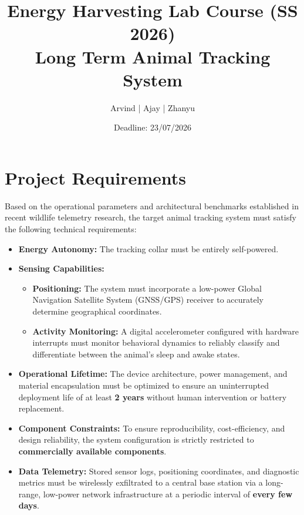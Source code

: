 \documentclass[paper=a4]{article}
\begin{document}
\title{Energy Harvesting Lab Course (SS 2026) \\ \Large    Long Term Animal Tracking System}
\author{Arvind | Ajay | Zhanyu} 
\date{Deadline: 23/07/2026} %
\maketitle

\section{Project Requirements}
Based on the operational parameters and architectural benchmarks established in recent wildlife telemetry research, the target animal tracking system must satisfy the following technical requirements:

\begin{itemize}
    \item \textbf{Energy Autonomy:} The tracking collar must be entirely self-powered.
    \item \textbf{Sensing Capabilities:}
    \begin{itemize}
        \item \textbf{Positioning:} The system must incorporate a low-power Global Navigation Satellite System (GNSS/GPS) receiver to accurately determine geographical coordinates.
        \item \textbf{Activity Monitoring:} A digital accelerometer configured with hardware interrupts must monitor behavioral dynamics to reliably classify and differentiate between the animal's sleep and awake states.
    \end{itemize}
    \item \textbf{Operational Lifetime:} The device architecture, power management, and material encapsulation must be optimized to ensure an uninterrupted deployment life of at least \textbf{2 years} without human intervention or battery replacement.
    \item \textbf{Component Constraints:} To ensure reproducibility, cost-efficiency, and design reliability, the system configuration is strictly restricted to \textbf{commercially available components}.
    \item \textbf{Data Telemetry:} Stored sensor logs, positioning coordinates, and diagnostic metrics must be wirelessly exfiltrated to a central base station via a long-range, low-power network infrastructure at a periodic interval of \textbf{every few days}.
\end{itemize}
\end{document}

